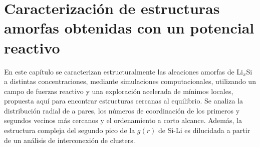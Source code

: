 \chapter{Caracterización de estructuras amorfas obtenidas con un potencial 
reactivo}\label{ch:caracterizacion}
\thispagestyle{empty}

\vspace{50pt}

\begin{adjustwidth}{50pt}{50pt}
    En este capítulo se caracterizan estructuralmente las aleaciones amorfas de
    Li$_x$Si a distintas concentraciones, mediante simulaciones computacionales,
    utilizando un campo de fuerzas reactivo y una exploración acelerada de mínimos
    locales, propuesta aquí para encontrar estructuras cercanas al equilibrio. Se
    analiza la distribución radial de a pares, los números de coordinación de los
    primeros y segundos vecinos más cercanos y el ordenamiento a corto alcance.
    Además, la estructura compleja del segundo pico de la $g(r)$ de Si-Li es 
    dilucidada a partir de un análisis de interconexión de clusters.
\end{adjustwidth}

\clearpage
\newpage
\thispagestyle{empty}
\mbox{}
\newpage












